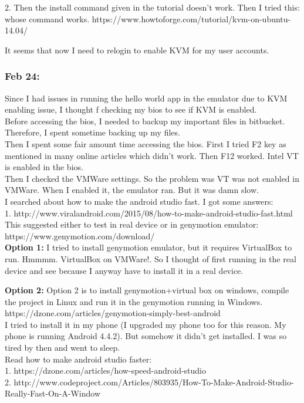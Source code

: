 \documentclass[11pt]{article}
\begin{document}
2. Then the install command given in the tutorial doesn't work. Then I tried this: whose command works. 
https://www.howtoforge.com/tutorial/kvm-on-ubuntu-14.04/

It seems that now I need to relogin to enable KVM for my user accounts. 

\subsubsection*{Feb 24:}
Since I had issues in running the hello world app in the emulator due to KVM enabling issue, I thought f checking my bios to see if KVM is enabled.\\
Before accessing the bios, I needed to backup my important files in bitbucket. Therefore, I spent sometime backing up my files.\\
Then I spent some fair amount time accessing the bios. First I tried F2 key as mentioned in many online articles which didn't work. Then F12 worked. 
Intel VT is enabled in the bios.\\
Then I checked the VMWare settings. So the problem was VT was not enabled in VMWare. When I enabled it, the emulator ran. But it was damn slow.\\

I searched about how to make the android studio fast. I got some answers:\\
1. http://www.viralandroid.com/2015/08/how-to-make-android-studio-fast.html\\
This suggested either to test in real device or in genymotion emulator: https://www.genymotion.com/download/\\

\textbf{Option 1: } I tried to install genymotion emulator, but it requires VirtualBox to run. Hmmmm. VirtualBox on VMWare!. So I thought of 
first running in the real device and see because I anyway have to install it in a real device.

\textbf{Option 2: } Option 2 is to install genymotion+virtual box on windows, compile the project in Linux and run it in the genymotion 
running in Windows. https://dzone.com/articles/genymotion-simply-best-android \\

I tried to install it in my phone (I upgraded my phone too for this reason. My phone is running Android 4.4.2). But somehow it didn't get installed.
I was so tired by then and went to sleep.\\

Read how to make android studio faster:\\
1. https://dzone.com/articles/how-speed-android-studio\\
2. http://www.codeproject.com/Articles/803935/How-To-Make-Android-Studio-Really-Fast-On-A-Window\\
\end{document}
